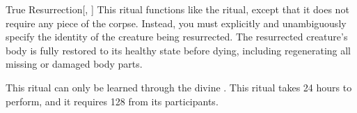\lowercase{\hypertarget{spell:True Resurrection}{}}\label{spell:True Resurrection}
\begin{freeability}[Rank 8]{\hypertarget{spell:True Resurrection}{True Resurrection}}[, ]
This ritual functions like the  ritual, except that it does not require any piece of the corpse.
Instead, you must explicitly and unambiguously specify the identity of the creature being resurrected.
The resurrected creature's body is fully restored to its healthy state before dying, including regenerating all missing or damaged body parts.

This ritual can only be learned through the divine .
This ritual takes 24 hours to perform, and it requires 128  from its participants.
\end{freeability}
\vspace{0.25em}

